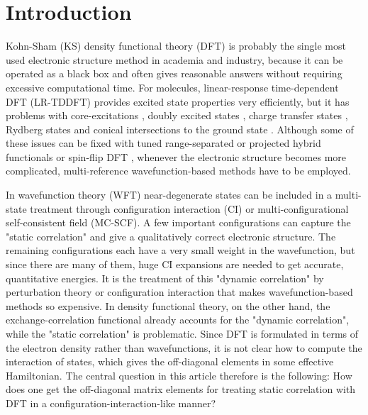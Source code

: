 \documentclass[journal=jpclcd,manuscript=letter]{achemso}
\begin{document}
\section{Introduction}
Kohn-Sham (KS) density functional theory (DFT) \cite{Hohenberg1964inhomogeneous,Kohn1965} is probably the single most used electronic structure
method in academia and industry, because it can be operated as a black box and often gives
reasonable answers without requiring excessive computational time.
For molecules, linear-response \cite{Casida1995} time-dependent \cite{Runge1984} DFT (LR-TDDFT) provides excited state properties very efficiently,
but it has problems with core-excitations \cite{Imamura2006time,Janesko2023projected},
doubly excited states \cite{Levine2006conical}, charge transfer states \cite{Dreuw2003long},
Rydberg states \cite{Dreuw2003long} and conical intersections to the ground state \cite{Levine2006conical}.
Although some of these issues can be fixed with tuned \cite{Stein2009reliable} range-separated \cite{Tawada2004long}
or projected \cite{Janesko2023projected} hybrid functionals or spin-flip DFT \cite{Shao2003spin},
whenever the electronic structure becomes more complicated, multi-reference wavefunction-based methods have to be employed.

In wavefunction theory (WFT) near-degenerate states can be included in a multi-state treatment
through configuration interaction (CI) or multi-configurational self-consistent field (MC-SCF).
A few important configurations can capture the "static correlation" and give a qualitatively correct
electronic structure. The remaining configurations each have a very small weight in the wavefunction,
but since there are many of them, huge CI expansions are needed to get accurate, quantitative energies.
It is the treatment of this
"dynamic correlation" by perturbation theory or configuration interaction
that makes wavefunction-based methods so expensive. In density functional theory, on the other hand, the exchange-correlation
functional already accounts for the "dynamic correlation", while the "static correlation" is problematic.
Since DFT is formulated in terms of the electron density rather than wavefunctions, it is not clear how to compute
the interaction of states, which gives the off-diagonal elements in some effective Hamiltonian.
The central question in this article therefore is the following: 
How does one get the off-diagonal matrix elements for treating static correlation with DFT in a configuration-interaction-like manner?
\end{document}
